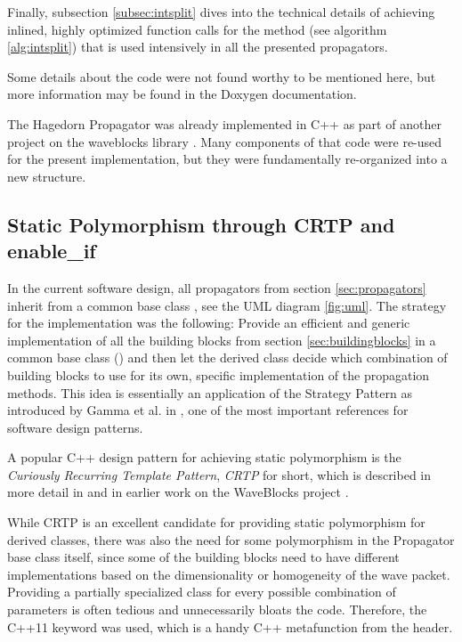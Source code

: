 Finally, subsection \ref{subsec:intsplit} dives into the technical details of achieving inlined, highly optimized function calls for the  method (see algorithm \ref{alg:intsplit}) that is used intensively in all the presented propagators.
\par\medskip
%
Some details about the code were not found worthy to be mentioned here,
but more information may be found in the Doxygen documentation.
\par\medskip
%
The Hagedorn Propagator was already implemented in C++ as part of another project on the waveblocks library \cite{libwaveblocks}.
Many components of that code were re-used for the present implementation, but they were fundamentally re-organized into a new structure.


\subsection{Static Polymorphism through CRTP and enable\_if}
\label{subsec:poly}
%
In the current software design, all propagators from section \ref{sec:propagators} inherit from a common base class , see the UML diagram \ref{fig:uml}.
The strategy for the implementation was the following:
Provide an efficient and generic implementation of all the building blocks from section \ref{sec:buildingblocks} in a common base class () and then let the derived class decide which combination of building blocks to use for its own, specific implementation of the propagation methods.
This idea is essentially an application of the Strategy Pattern as introduced by Gamma et al. in \cite{Gamma1995}, one of the most important references for software design patterns.
\par\medskip
%
A popular C++ design pattern for achieving static polymorphism is the \emph{Curiously Recurring Template Pattern}, \emph{CRTP} for short, which is described in more detail in \cite{C_CRTP} and in earlier work on the WaveBlocks project \cite{LWB_wavepackets}.
\par\medskip
%
While CRTP is an excellent candidate for providing static polymorphism for derived classes, there was also the need for some polymorphism in the Propagator base class itself, since some of the building blocks need to have different implementations based on the dimensionality or homogeneity of the wave packet. 
Providing a partially specialized class for every possible combination of parameters is often tedious and unnecessarily bloats the code.
Therefore, the C++11  keyword was used, which is a handy C++ metafunction from the  header.
